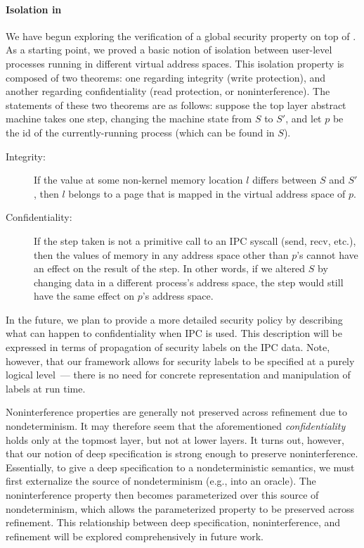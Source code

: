 {\paragraph{Isolation in \mCTOSbase{}}
\label{security}
We have begun exploring the verification of a global security property
on top of \mCTOSbase{}. As a starting point, we proved a basic notion
of isolation between user-level processes running in different virtual
address spaces. This isolation property is composed of two theorems:
one regarding integrity (write protection), and another regarding
confidentiality (read protection, or noninterference).  The statements
of these two theorems are as follows: suppose the top layer abstract
machine takes one step, changing the machine state from $S$ to $S'$,
and let $p$ be the id of the currently-running process (which can be
found in $S$).
\begin{description}
  \item[Integrity:]
If the value at some non-kernel memory location $l$ differs between
$S$ and $S'$, then $l$ belongs to a page that is mapped in the 
virtual address space of $p$.
\item[Confidentiality:]
\label{confidential}
If the step taken
is not a primitive call to an IPC syscall (send, recv, etc.), then the values
of memory in any address space other than $p$'s cannot have an effect on the
result of the step. In other words, if we altered $S$ 
by changing data in a different process's address space, the step would still 
have the same effect on $p$'s address space.
\end{description}

In the future, we plan to provide a more detailed security policy by
describing what can happen to confidentiality when IPC is used.  This
description will be expressed in terms of propagation of security
labels on the IPC data. Note, however, that our framework allows for
security labels to be specified at a purely logical level~--- there is
no need for concrete representation and manipulation of labels at run
time.

Noninterference properties are generally not preserved across
refinement due to nondeterminism. It may therefore seem that the
aforementioned \emph{confidentiality} holds only at the topmost layer,
but not at lower layers. It turns out, however, that our notion of
deep specification is strong enough to preserve
noninterference. Essentially, to give a deep specification to a
nondeterministic semantics, we must first externalize the source of
nondeterminism (e.g., into an oracle). The noninterference property
then becomes parameterized over this source of nondeterminism, which
allows the parameterized property to be preserved across
refinement. This relationship between deep specification,
noninterference, and refinement will be explored comprehensively in
future work.
}

